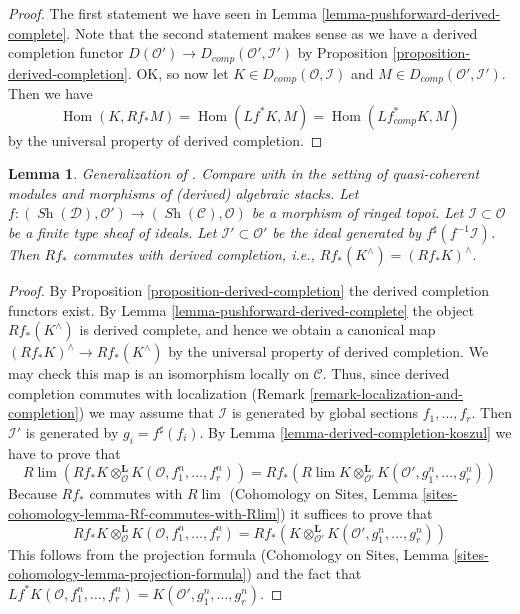 \documentclass{stacks-project}
\newenvironment{reference}{\comment}{\endcomment}
\theoremstyle{plain}
\newtheorem{lemma}[subsection]{Lemma}
\theoremstyle{definition}
\theoremstyle{remark}
\numberwithin{equation}{subsection}
\def\lim{\mathop{\mathrm{lim}}\nolimits}
\def\Hom{\mathop{\mathrm{Hom}}\nolimits}
\def\Sh{\mathop{\mathit{Sh}}\nolimits}
\begin{document}
\begin{proof}
The first statement we have seen in
Lemma \ref{lemma-pushforward-derived-complete}.
Note that the second statement makes sense as we have a derived
completion functor $D(\mathcal{O}') \to D_{comp}(\mathcal{O}', \mathcal{I}')$
by Proposition \ref{proposition-derived-completion}.
OK, so now let $K \in D_{comp}(\mathcal{O}, \mathcal{I})$
and $M \in D_{comp}(\mathcal{O}', \mathcal{I}')$. Then we have
$$
\Hom(K, Rf_*M) = \Hom(Lf^*K, M) = \Hom(Lf_{comp}^*K, M)
$$
by the universal property of derived completion.
\end{proof}

\begin{lemma}
\label{lemma-pushforward-commutes-with-derived-completion}
\begin{reference}
Generalization of \cite[Lemma 6.5.9 (2)]{BS}. Compare with
\cite[Theorem 6.5]{HL-P} in the setting of quasi-coherent modules
and morphisms of (derived) algebraic stacks.
\end{reference}
Let $f : (\Sh(\mathcal{D}), \mathcal{O}') \to (\Sh(\mathcal{C}), \mathcal{O})$
be a morphism of ringed topoi. Let $\mathcal{I} \subset \mathcal{O}$
be a finite type sheaf of ideals. Let $\mathcal{I}' \subset \mathcal{O}'$
be the ideal generated by $f^\sharp(f^{-1}\mathcal{I})$.
Then $Rf_*$ commutes with derived completion, i.e.,
$Rf_*(K^\wedge) = (Rf_*K)^\wedge$.
\end{lemma}

\begin{proof}
By Proposition \ref{proposition-derived-completion} the derived completion
functors exist. By Lemma \ref{lemma-pushforward-derived-complete} the object
$Rf_*(K^\wedge)$ is derived complete, and hence we obtain a canonical map
$(Rf_*K)^\wedge \to Rf_*(K^\wedge)$ by the universal property of derived
completion. We may check this map is an isomorphism locally on $\mathcal{C}$.
Thus, since derived completion commutes with localization
(Remark \ref{remark-localization-and-completion}) we may assume
that $\mathcal{I}$ is generated by global sections $f_1, \ldots, f_r$.
Then $\mathcal{I}'$ is generated by $g_i = f^\sharp(f_i)$. By
Lemma \ref{lemma-derived-completion-koszul}
we have to prove that
$$
R\lim \left(
Rf_*K \otimes^\mathbf{L}_\mathcal{O} K(\mathcal{O}, f_1^n, \ldots, f_r^n)
\right)
=
Rf_*\left(
R\lim
K \otimes^\mathbf{L}_{\mathcal{O}'} K(\mathcal{O}', g_1^n, \ldots, g_r^n)
\right)
$$
Because $Rf_*$ commutes with $R\lim$
(Cohomology on Sites, Lemma
\ref{sites-cohomology-lemma-Rf-commutes-with-Rlim})
it suffices to prove that
$$
Rf_*K \otimes^\mathbf{L}_\mathcal{O} K(\mathcal{O}, f_1^n, \ldots, f_r^n) =
Rf_*\left(
K \otimes^\mathbf{L}_{\mathcal{O}'} K(\mathcal{O}', g_1^n, \ldots, g_r^n)
\right)
$$
This follows from the projection formula (Cohomology on Sites, Lemma
\ref{sites-cohomology-lemma-projection-formula}) and the fact that
$Lf^*K(\mathcal{O}, f_1^n, \ldots, f_r^n) =
K(\mathcal{O}', g_1^n, \ldots, g_r^n)$.
\end{proof}
\end{document}
